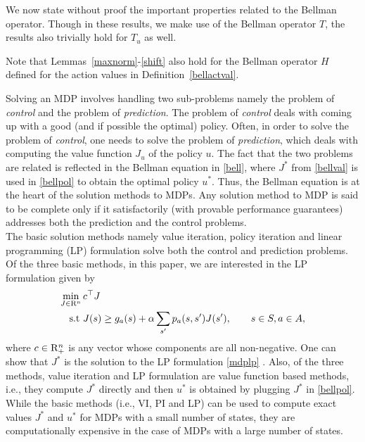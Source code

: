 We now state without proof the important properties related to the Bellman operator. Though in these results, we make use of the Bellman operator $T$, the results also trivially hold for $T_u$ as well.

Note that Lemmas~\ref{maxnorm}-\ref{shift} also hold for the Bellman operator $H$ defined for the action values in Definition~\ref{bellactval}.\par
Solving an MDP involves handling two sub-problems namely the problem of \emph{control} and the problem of \emph{prediction}. The problem of \emph{control} deals with coming up with a good (and if possible the optimal) policy. Often, in order to solve the problem of \emph{control}, one needs to solve the problem of \emph{prediction}, which deals with computing the value function $J_u$ of the policy $u$. The fact that the two problems are related is reflected in the Bellman equation in \eqref{bell}, where $J^*$ from \eqref{bellval} is used in \eqref{bellpol} to obtain the optimal policy $u^*$. Thus, the Bellman equation is at the heart of the solution methods to MDPs. Any solution method to MDP is said to be complete only if it satisfactorily (with provable performance guarantees) addresses both the prediction and the control problems. \\
The basic solution methods namely value iteration, policy iteration and linear programming (LP) formulation \cite{BertB} solve both the control and prediction problems. Of the three basic methods, in this paper, we are interested in the LP formulation given by
\begin{align}\label{mdplp}
\begin{split}
\min_{J\in \mathrm{R}^n}\, &c^\top J\\
\text{s.t}\mbox{ } &J(s)\geq g_a(s)+\alpha\sum_{s'}p_a(s,s')J(s'), \qquad s\in S, a \in A,
\end{split}
\end{align}
where $c\in \mathrm{R}^n_+$ is any vector whose components are all non-negative. One can show that $J^*$ is the solution to the LP formulation \eqref{mdplp} \cite{BertB}. 
Also, of the three methods, value iteration and LP formulation are value function based methods, i.e., they compute $J^*$ directly and then $u^*$ is obtained by plugging $J^*$ in \eqref{bellpol}.\\
While the basic methods (i.e., VI, PI and LP) can be used to compute exact values $J^*$ and $u^*$ for MDPs with a small number of states, they are computationally expensive in the case of MDPs with a large number of states.\\

